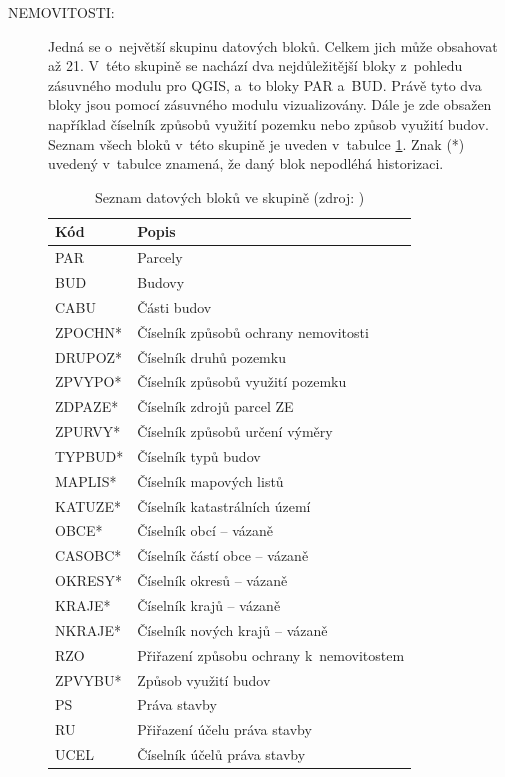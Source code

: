 \documentclass[a4paper,12pt,oneside]{book}
\begin{document}
\begin{description}
 \item[NEMOVITOSTI:] Jedná se o~největší skupinu datových bloků. Celkem jich může obsahovat až 21. V~této skupině se nachází dva nejdůležitější bloky z~pohledu zásuvného modulu pro QGIS, a~to bloky PAR a~BUD. Právě tyto dva bloky jsou pomocí zásuvného modulu vizualizovány. Dále je zde obsažen například číselník způsobů využití pozemku nebo způsob využití budov. Seznam všech bloků v~této skupině je uveden v~tabulce \ref{t_skupina_nemovitosti}. Znak (*) uvedený v~tabulce znamená, že daný blok nepodléhá historizaci.
 
\begin{table}[htbp]
\centering
\caption[Seznam datových bloků ve skupině ]{Seznam datových bloků ve skupině  (zdroj: \cite{vfk_struktura})}
\begin{tabular}{ll}
\toprule
\textbf{Kód} & \textbf{Popis} \\ 
\midrule
PAR & Parcely \\ 
BUD & Budovy \\ 
CABU & Části budov \\ 
ZPOCHN* & Číselník způsobů ochrany nemovitosti \\
DRUPOZ* & Číselník druhů pozemku \\
ZPVYPO* & Číselník způsobů využití pozemku \\
ZDPAZE* & Číselník zdrojů parcel ZE \\
ZPURVY* & Číselník způsobů určení výměry \\
TYPBUD* & Číselník typů budov \\
MAPLIS* & Číselník mapových listů \\
KATUZE* & Číselník katastrálních území \\
OBCE* & Číselník obcí -- vázaně \\
CASOBC* & Číselník částí obce -- vázaně \\
OKRESY* & Číselník okresů -- vázaně \\
KRAJE* & Číselník krajů -- vázaně \\
NKRAJE* & Číselník nových krajů -- vázaně \\
RZO & Přiřazení způsobu ochrany k~nemovitostem \\
ZPVYBU* & Způsob využití budov \\
PS & Práva stavby \\
RU & Přiřazení účelu práva stavby \\
UCEL & Číselník účelů práva stavby \\
\bottomrule
\end{tabular}
\label{t_skupina_nemovitosti}
\end{table}
 

\end{description}
\end{document}
